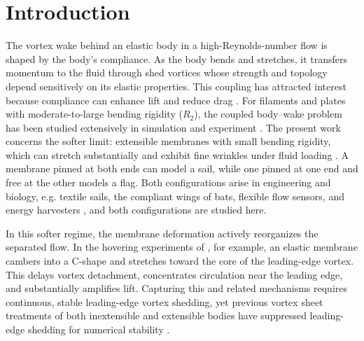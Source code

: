 \documentclass{article}[12pt]
\theoremstyle{Theorem}
\begin{document}
\section{Introduction}
The vortex wake behind an elastic body in a high-Reynolds-number flow is shaped by the body's compliance. As the body bends and stretches, it transfers momentum to the fluid through shed vortices whose strength and topology depend sensitively on its elastic properties. This coupling has attracted interest because compliance can enhance lift \cite{gordnier2009high, gehrke2025highly} and reduce drag \cite{alben2002drag}. For filaments and plates with moderate-to-large bending rigidity ($R_2$), the coupled body--wake problem has been studied extensively in simulation \cite{shelley2011flapping, alben2009simulating, alben2022dynamics, connell2007flapping, argentina2005fluid, huang2010three, tian2013role, hwa2014flapping} and experiment \cite{jia2018experimental, eloy2008aeroelastic, eloy2012origin}. The present work concerns the softer limit: extensible membranes with small bending rigidity, which can stretch substantially and exhibit fine wrinkles under fluid loading \cite{attar2012experimental, tzezana2019thrust, mavroyiakoumou2020large, mavroyiakoumou2025sail}. A membrane pinned at both ends can model a sail, while one pinned at one end and free at the other models a flag. Both configurations arise in engineering and biology, e.g. textile sails, the compliant wings of bats, flexible flow sensors, and energy harvesters \cite{konow2015spring, wang2016stability, yu2019review,yeh2025influence}, and both configurations are studied here.
\newline

In this softer regime, the membrane deformation actively reorganizes the separated flow. In the hovering experiments of \cite{gehrke2025highly, gehrke2022aeroelastic}, for example, an elastic membrane cambers into a C-shape and stretches toward the core of the leading-edge vortex. This delays vortex detachment, concentrates circulation near the leading edge, and substantially amplifies lift. Capturing this and related mechanisms requires continuous, stable leading-edge vortex shedding, yet previous vortex sheet treatments of both inextensible and extensible bodies have suppressed leading-edge shedding for numerical stability \cite{alben2009simulating, mavroyiakoumou2020large, mavroyiakoumou2025sail}.
\newline
\end{document}
